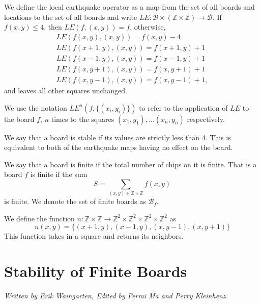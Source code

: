 \documentclass[runningheads,a4paper]{llncs}
\begin{document}
\begin{definition}
 We define the local earthquake operator as a map from the set of all boards and locations to the set of all boards and write $LE: \mathcal{B} \times (\mathbb{Z} \times \mathbb{Z}) \rightarrow \mathcal{B}$.
If $f(x,y) \leq 4$, then $LE(f, (x,y)) = f$, otherwise,  
\begin{align*}
LE( f(x,y), (x,y)) = f(x,y)-4 \\
LE( f(x+1,y), (x,y)) = f(x+1,y)+1 \\
LE( f(x-1,y), (x,y)) = f(x-1,y)+1 \\
LE( f(x,y+1), (x,y)) = f(x,y+1)+1 \\
LE( f(x,y-1), (x,y)) = f(x,y-1)+1,
\end{align*}
and leaves all other squares unchanged.

We use the notation $LE^n(f, \{(x_i,y_i)\})$ to refer to the application of $LE$ to the board $f$, $n$ times to the squares $(x_1, y_1), \ldots (x_{n}, y_{n})$ respectively. 
\end{definition}

\begin{definition}
We say that a board is stable if its values are strictly less than 4. This is equivalent to both of the earthquake maps having no effect on the board. 
\end{definition}

\begin{definition} 
We say that a board is finite if the total number of chips on it is finite. That is a board $f$ is finite if the sum
\begin{equation}
S= \sum_{(x,y) \in \mathbb{Z} \times \mathbb{Z}} f(x,y) 
\end{equation}
is finite. 
We denote the set of finite boards as $\mathcal{B}_f$.
\end{definition}

\begin{definition}
We define the function $n: \mathbb{Z} \times \mathbb{Z} \rightarrow \mathbb{Z}^2 \times \mathbb{Z}^2 \times \mathbb{Z}^2 \times \mathbb{Z}^2 $ as 
\begin{equation}
n(x,y) = \{ (x+1, y), (x-1, y), (x, y-1), (x, y+1) \}
\end{equation}
This function takes in a square and returns its neighbors. 
\end{definition}

\section{Stability of Finite Boards}
\label{Stability of Finite Boards}
\emph{Written by Erik Waingarten, Edited by Fermi Ma and Perry Kleinhenz.}
\end{document}
